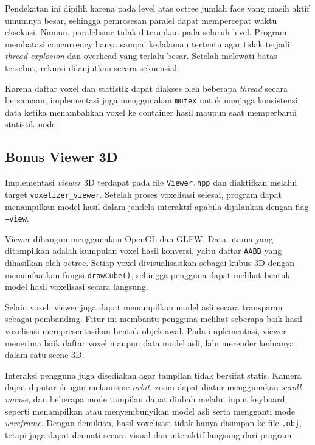 \documentclass[12pt, a4paper]{report}
\begin{document}
Pendekatan ini dipilih karena pada level atas octree jumlah face yang
masih aktif umumnya besar, sehingga pemrosesan paralel dapat mempercepat
waktu eksekusi. Namun, paralelisme tidak diterapkan pada seluruh level.
Program membatasi concurrency hanya sampai kedalaman tertentu agar tidak
terjadi \textit{thread explosion} dan overhead yang terlalu besar.
Setelah melewati batas tersebut, rekursi dilanjutkan secara sekuensial.

Karena daftar voxel dan statistik dapat diakses oleh beberapa
\textit{thread} secara bersamaan, implementasi juga menggunakan
\texttt{mutex} untuk menjaga konsistensi data ketika menambahkan voxel
ke container hasil maupun saat memperbarui statistik node.

\subsection{Bonus Viewer 3D}

Implementasi \textit{viewer} 3D terdapat pada file \texttt{Viewer.hpp}
dan diaktifkan melalui target \texttt{voxelizer\_viewer}. Setelah proses
voxelisasi selesai, program dapat menampilkan model hasil dalam jendela
interaktif apabila dijalankan dengan flag \texttt{--view}.

Viewer dibangun menggunakan OpenGL dan GLFW. Data utama yang ditampilkan
adalah kumpulan voxel hasil konversi, yaitu daftar \texttt{AABB} yang
dihasilkan oleh octree. Setiap voxel divisualisasikan sebagai kubus 3D
dengan memanfaatkan fungsi \texttt{drawCube()}, sehingga pengguna dapat
melihat bentuk model hasil voxelisasi secara langsung.

Selain voxel, viewer juga dapat menampilkan model asli secara transparan
sebagai pembanding. Fitur ini membantu pengguna melihat seberapa baik
hasil voxelisasi merepresentasikan bentuk objek awal. Pada implementasi,
viewer menerima baik daftar voxel maupun data model asli, lalu
merender keduanya dalam satu scene 3D.

Interaksi pengguna juga disediakan agar tampilan tidak bersifat statis.
Kamera dapat diputar dengan mekanisme \textit{orbit}, zoom dapat diatur
menggunakan \textit{scroll mouse}, dan beberapa mode tampilan dapat
diubah melalui input keyboard, seperti menampilkan atau menyembunyikan
model asli serta mengganti mode \textit{wireframe}. Dengan demikian,
hasil voxelisasi tidak hanya disimpan ke file \texttt{.obj}, tetapi juga
dapat diamati secara visual dan interaktif langsung dari program.
\end{document}
